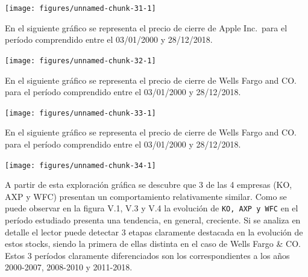 \documentclass[]{DissertateUSU}
\begin{document}
\begin{center}\texttt{[image: figures/unnamed-chunk-31-1]} \end{center}

\setlength\parskip{5ex}
\justifying

\noindent En el siguiente gráfico se representa el precio de cierre de
Apple Inc.~para el período comprendido entre el 03/01/2000 y 28/12/2018.

\begin{center}\texttt{[image: figures/unnamed-chunk-32-1]} \end{center}

\setlength\parskip{5ex}
\justifying

\noindent En el siguiente gráfico se representa el precio de cierre de
Wells Fargo and CO. para el período comprendido entre el 03/01/2000 y
28/12/2018.

\begin{center}\texttt{[image: figures/unnamed-chunk-33-1]} \end{center}
\centering

\setlength\parskip{5ex}
\justifying

\noindent En el siguiente gráfico se representa el precio de cierre de
Wells Fargo and CO. para el período comprendido entre el 03/01/2000 y
28/12/2018.

\begin{center}\texttt{[image: figures/unnamed-chunk-34-1]} \end{center}
\centering

\setlength\parskip{5ex}
\justifying

\noindent A partir de esta exploración gráfica se descubre que 3 de las
4 empresas (KO, AXP y WFC) presentan un comportamiento relativamente
similar. Como se puede observar en la figura V.1, V.3 y V.4 la evolución
de \texttt{KO,\ AXP\ y\ WFC} en el período estudiado presenta una
tendencia, en general, creciente. Si se analiza en detalle el lector
puede detectar 3 etapas claramente destacada en la evolución de estos
stocks, siendo la primera de ellas distinta en el caso de Wells Fargo \&
CO. Estos 3 períodos claramente diferenciados son los correspondientes a
los años 2000-2007, 2008-2010 y 2011-2018.
\end{document}
